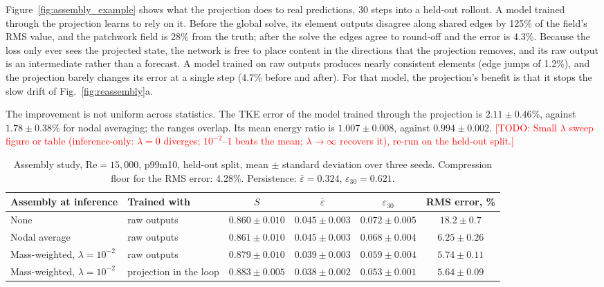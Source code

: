 \documentclass[conf]{new-aiaa}
\newcommand{\todo}[1]{\textcolor{red}{[TODO: #1]}}
\newcommand{\Rey}{\mathrm{Re}}
\begin{document}
Figure~\ref{fig:assembly_example} shows what the projection does to real predictions, 30 steps into a held-out rollout. A model trained through the projection learns to rely on it. Before the global solve, its element outputs disagree along shared edges by 125\% of the field's RMS value, and the patchwork field is 28\% from the truth; after the solve the edges agree to round-off and the error is 4.3\%. Because the loss only ever sees the projected state, the network is free to place content in the directions that the projection removes, and its raw output is an intermediate rather than a forecast. A model trained on raw outputs produces nearly consistent elements (edge jumps of 1.2\%), and the projection barely changes its error at a single step (4.7\% before and after). For that model, the projection's benefit is that it stops the slow drift of Fig.~\ref{fig:reassembly}a.

The improvement is not uniform across statistics. The TKE error of the model trained through the projection is $2.11\pm0.46$\%, against $1.78\pm0.38$\% for nodal averaging; the ranges overlap. Its mean energy ratio is $1.007\pm0.008$, against $0.994\pm0.002$. \todo{Small $\lambda$ sweep figure or table (inference-only: $\lambda=0$ diverges; $10^{-2}$--$1$ beats the mean; $\lambda\to\infty$ recovers it), re-run on the held-out split.}

\begin{table}[!tbp]
  \centering
  \small
  \caption{Assembly study, $\Rey=15{,}000$, p99m10, held-out split, mean $\pm$ standard deviation over three seeds. Compression floor for the RMS error: 4.28\%. Persistence: $\bar\varepsilon=0.324$, $\varepsilon_{30}=0.621$.}
  \label{tab:assembly}
  \begin{tabular}{llcccc}
    \toprule
    Assembly at inference & Trained with & $S$ & $\bar\varepsilon$ & $\varepsilon_{30}$ & RMS error, \% \\
    \midrule
    None & raw outputs & $0.860\pm0.010$ & $0.045\pm0.003$ & $0.072\pm0.005$ & $18.2\pm0.7$ \\
    Nodal average & raw outputs & $0.861\pm0.010$ & $0.045\pm0.003$ & $0.068\pm0.004$ & $6.25\pm0.26$ \\
    Mass-weighted, $\lambda=10^{-2}$ & raw outputs & $0.879\pm0.010$ & $0.039\pm0.003$ & $0.059\pm0.004$ & $5.74\pm0.11$ \\
    Mass-weighted, $\lambda=10^{-2}$ & projection in the loop & $0.883\pm0.005$ & $0.038\pm0.002$ & $0.053\pm0.001$ & $5.64\pm0.09$ \\
    \bottomrule
  \end{tabular}
\end{table}
\end{document}
